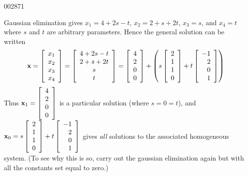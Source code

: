 \begin{example}{}{002871}
\newpage
\begin{solution}
  Gaussian elimination gives $x_{1} = 4 + 2s - t$, $x_{2} = 2 + s + 2t$, $x_{3} = s$, and $x_{4} = t$ where $s$ and $t$ are arbitrary parameters. Hence the general solution can be written
\begin{equation*}
\textbf{x} = \left[ \begin{array}{c}
x_{1} \\
x_{2} \\
x_{3} \\
x_{4}
\end{array} \right] = 
\left[ \begin{array}{c}
4 + 2s - t \\
2 + s + 2t \\
s \\
t
\end{array} \right] = 
\left[ \begin{array}{r}
4 \\
2 \\
0 \\
0
\end{array} \right] +
\left( s \left[ \begin{array}{r}
2 \\
1 \\
1 \\
0
\end{array} \right] + t \left[ \begin{array}{r}
-1 \\
2 \\
0 \\
1
\end{array} \right] \right)
\end{equation*}
Thus 
$\textbf{x}_1 = \left[ \begin{array}{r}
4 \\
2 \\
0 \\
0
\end{array} \right]$
 is a particular solution (where $s = 0 = t$), and 
$
\textbf{x}_{0} = s \left[ \begin{array}{r}
2 \\
1 \\
1 \\
0
\end{array} \right] + t \left[ \begin{array}{r}
-1 \\
2 \\
0 \\
1
\end{array} \right]$ gives \textit{all} solutions to the associated homogeneous system. (To see why this is so, carry out the gaussian elimination again but with all the constants set equal to zero.)
\end{solution}
\end{example}

